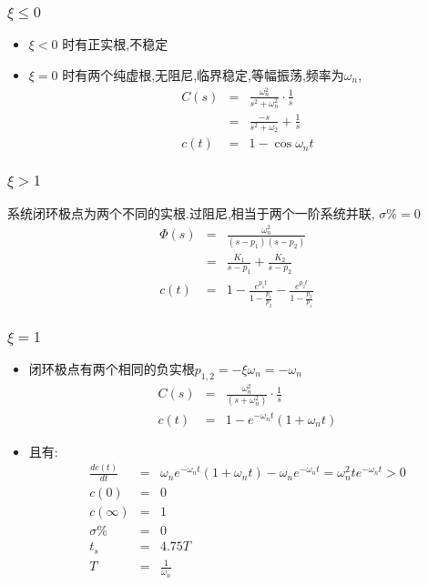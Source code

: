 \documentclass{article}
\begin{document}
\begin{frame}
\frametitle{$\xi\leq 0$}
\label{sec-1-2-2}

\begin{itemize}
\item <2-> $\xi< 0$ 时有正实根,不稳定
\item <3-> $\xi=0$ 时有两个纯虚根,无阻尼,临界稳定,等幅振荡,频率为$\omega_n$,
	 \begin{eqnarray*}
	 C(s) & = & \frac{\omega_n^2}{s^2+\omega_n^2}\cdot \frac{1}{s}  \\
	      & =& \frac{-s}{s^2+\omega_2}+\frac{1}{s} \\
	 c(t) &=& 1-\cos\omega_n t
	 \end{eqnarray*}
\end{itemize}
\end{frame}
\begin{frame}
\frametitle{$\xi>1$}
\label{sec-1-2-3}

    系统闭环极点为两个不同的实根.过阻尼,相当于两个一阶系统并联, $\sigma\%=0$
       \begin{eqnarray*}
       \Phi(s) & = & \frac{\omega_n^2}{(s-p_1)(s-p_2)} \\
	       & = & \frac{K_1}{s-p_1}+\frac{K_2}{s-p_2}\\
       c(t)    &=& 1-\frac{e^{p_1 t}}{1-\frac{p_1}{p_2}}-\frac{e^{p_2 t}}{1-\frac{p_2}{p_1}}
       \end{eqnarray*}
\end{frame}
\begin{frame}
\frametitle{$\xi=1$}
\label{sec-1-2-4}

\begin{itemize}
\item <1-> 闭环极点有两个相同的负实根$p_{1,2}=-\xi\omega_n=-\omega_n$
       \begin{eqnarray*}
       C(s) & = &\frac{\omega_n^2}{(s+\omega_n^2)}\cdot\frac{1}{s} \\
       c(t) &=& 1-e^{-\omega_n t}(1+\omega_n t)
       \end{eqnarray*}
\item <2-> 且有:
       \begin{eqnarray*}
       \frac{dc(t)}{dt} &=& \omega_ne^{-\omega_n t}(1+\omega_n t)-\omega_n e^{-\omega_n t}
       	=  \omega_n^2 te^{-\omega_n t} 
       	>  0 \\
       c(0) &=&0 \\
       c(\infty)&=&1\\
       \sigma \% &=& 0\\
       t_s &=& 4.75T \\
       T &=&\frac{1}{\omega_n}
       \end{eqnarray*}
\end{itemize}
\end{frame}
\end{document}
